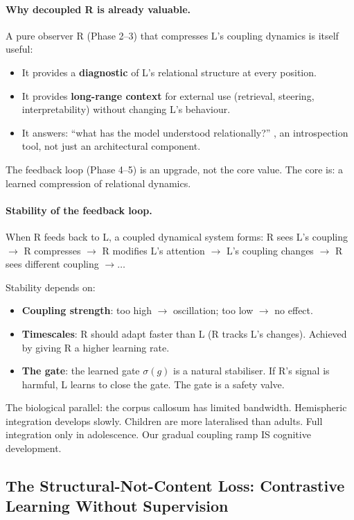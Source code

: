 \documentclass[11pt, a4paper]{article}
\theoremstyle{plain}
\theoremstyle{definition}
\theoremstyle{remark}
\begin{document}
\paragraph{Why decoupled R is already valuable.}
A pure observer R (Phase 2--3) that compresses L's coupling dynamics is itself useful:
\begin{itemize}[nosep]
\item It provides a \textbf{diagnostic} of L's relational structure at every position.
\item It provides \textbf{long-range context} for external use (retrieval, steering, interpretability) without changing L's behaviour.
\item It answers: ``what has the model understood relationally?'' ,  an introspection tool, not just an architectural component.
\end{itemize}
The feedback loop (Phase 4--5) is an upgrade, not the core value.
The core is: a learned compression of relational dynamics.

\paragraph{Stability of the feedback loop.}
When R feeds back to L, a coupled dynamical system forms:
R sees L's coupling $\to$ R compresses $\to$ R modifies L's attention $\to$ L's coupling changes $\to$ R sees different coupling $\to \ldots$

Stability depends on:
\begin{itemize}[nosep]
\item \textbf{Coupling strength}: too high $\to$ oscillation; too low $\to$ no effect.
\item \textbf{Timescales}: R should adapt faster than L (R tracks L's changes). Achieved by giving R a higher learning rate.
\item \textbf{The gate}: the learned gate $\sigma(g)$ is a natural stabiliser. If R's signal is harmful, L learns to close the gate. The gate is a safety valve.
\end{itemize}

The biological parallel: the corpus callosum has limited bandwidth.
Hemispheric integration develops slowly.
Children are more lateralised than adults.
Full integration only in adolescence.
Our gradual coupling ramp IS cognitive development.


\subsection{The Structural-Not-Content Loss: Contrastive Learning Without Supervision}
\label{sec:structural-loss}
\end{document}
